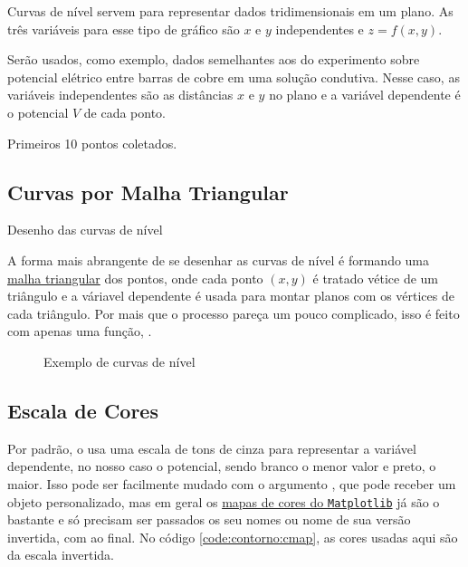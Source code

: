 Curvas de nível servem para representar dados tridimensionais em um plano. As três variáveis para esse tipo de gráfico são $x$ e $y$ independentes e $z = f(x,y)$.

Serão usados, como exemplo, dados semelhantes aos do experimento sobre potencial elétrico entre barras de cobre em uma solução condutiva. Nesse caso, as variáveis independentes são as distâncias $x$ e $y$ no plano e a variável dependente é o potencial $V$ de cada ponto.

\begin{table}[H]
    \centering
    
    \caption{Primeiros 10 pontos coletados.}
    \label{tab:contorno:dados}
\end{table}


\subsection{Curvas por Malha Triangular}
    \begin{listing}[H]
        \caption{Desenho das curvas de nível}
        \label{code:contorno:base}

    \end{listing}

    A forma mais abrangente de se desenhar as curvas de nível é formando uma \href{https://www.wikiwand.com/pt/Malha_triangular}{malha triangular} dos pontos, onde cada ponto $(x, y)$ é tratado vétice de um triângulo e a váriavel dependente é usada para montar planos com os vértices de cada triângulo. Por mais que o processo pareça um pouco complicado, isso é feito com apenas uma função, .

    \begin{figure}[H]
        \centering
        

        \caption{Exemplo de curvas de nível}
        \label{fig:contorno:base}
    \end{figure}


\subsection{Escala de Cores} \label{sec:contorno:cmap}

    Por padrão, o  usa uma escala de tons de cinza para representar a variável dependente, no nosso caso o potencial, sendo branco o menor valor e preto, o maior. Isso pode ser facilmente mudado com o argumento , que pode receber um objeto  personalizado, mas em geral os \href{https://matplotlib.org/3.1.0/gallery/color/colormap_reference.html}{mapas de cores do \texttt{Matplotlib}} já são o bastante e só precisam ser passados os seu nomes ou nome de sua versão invertida, com  ao final. No código \ref{code:contorno:cmap}, as cores usadas aqui são da escala  invertida.

